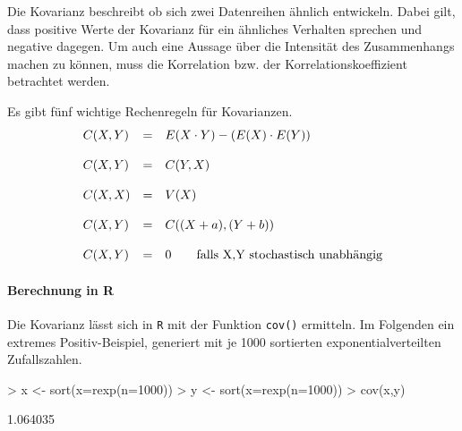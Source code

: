 Die \gls{Kovarianz} beschreibt ob sich zwei Datenreihen ähnlich 
entwickeln. Dabei gilt, dass positive Werte der Kovarianz für ein 
ähnliches Verhalten sprechen und negative dagegen. Um auch eine
Aussage über die Intensität des Zusammenhangs machen zu können,
muss die Korrelation bzw. der Korrelationskoeffizient betrachtet 
werden.

Es gibt fünf wichtige Rechenregeln für Kovarianzen.
\[ \begin{array}{l c l}
	C(X,Y) 
		& =
		& E(X \cdot Y) - (E(X) \cdot E(Y)) \\
	& & \\
	C(X,Y) 
		& =
		& C(Y,X) \\
	& & \\
	C(X,X) 
		& =
		& V(X) \\
	& & \\
	C(X,Y)
		& = 
		& C((X+a),(Y+b)) \\
	& & \\
	C(X,Y) 
		& =
		& 0 \qquad \text{falls } $X,Y$ \text{ stochastisch unabhängig} \\
\end{array} \]

\paragraph{Berechnung in R}
Die Kovarianz lässt sich in \lstinline{R} mit der Funktion 
\lstinline{cov()} ermitteln. Im Folgenden ein extremes 
Positiv-Beispiel, generiert mit je 1000 sortierten 
exponentialverteilten Zufallszahlen. 
\begin{Schunk}
\begin{Sinput}
> x <- sort(x=rexp(n=1000))
> y <- sort(x=rexp(n=1000))
> cov(x,y)
\end{Sinput}
\begin{Soutput}
[1] 1.064035
\end{Soutput}
\end{Schunk}

